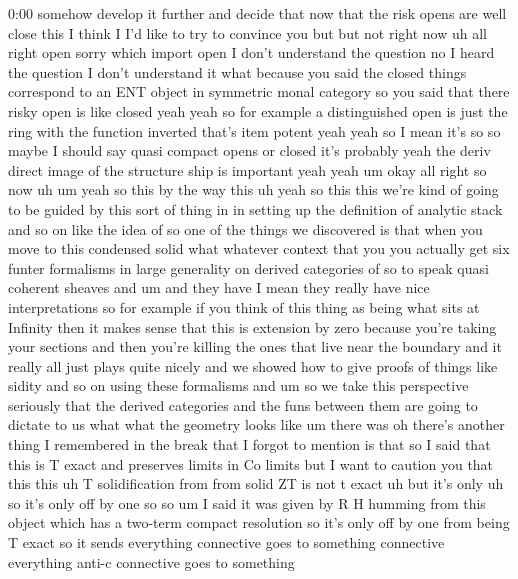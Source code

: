 \begin{unfinished}{0:00}
somehow  develop  it  further  and  decide
that  now  that  the  risk  opens
are  well  close
this  I  think  I  I'd  like  to  try  to
convince  you  but  but  not  right  now
uh  all
right
open  sorry  which  import
open  I  don't  understand  the
question  no  I  heard  the  question  I  don't
understand  it  what  because  you  said  the
closed  things  correspond  to  an  ENT
object  in  symmetric  monal  category  so
you  said  that  there  risky  open  is  like
closed  yeah  yeah  so  for  example  a
distinguished  open  is  just  the  ring  with
the  function  inverted  that's  item  potent
yeah
yeah  so  I  mean  it's  so  so  maybe  I  should
say  quasi  compact  opens  or  closed  it's
probably
yeah  the  deriv  direct  image  of  the
structure  ship  is  important  yeah  yeah  um
okay  all  right  so  now
uh  um  yeah  so  this  by  the  way  this
uh  yeah  so  this  this  we're  kind  of  going
to  be  guided  by  this  sort  of  thing  in  in
setting  up  the  definition  of  analytic
stack  and  so  on  like  the  idea  of  so  one
of  the  things  we  discovered  is  that  when
you  move  to  this  condensed  solid  what
whatever  context  that  you  you  actually
get  six  funter  formalisms  in  large
generality  on  derived  categories  of  so
to  speak  quasi  coherent  sheaves  and  um
and  they  have  I  mean  they  really  have
nice  interpretations  so  for  example  if
you  think  of  this  thing  as  being  what
sits  at  Infinity  then  it  makes  sense
that  this  is  extension  by  zero  because
you're  taking  your  sections  and  then
you're  killing  the  ones  that  live  near
the  boundary  and  it  really  all  just
plays  quite  nicely  and  we  showed  how  to
give  proofs  of  things  like  sidity  and  so
on  using  these  formalisms  and  um  so  we
take  this  perspective  seriously  that  the
derived  categories  and  the  funs  between
them  are  going  to  dictate  to  us  what
what  the  geometry  looks
like  um  there  was  oh  there's  another
thing  I  remembered  in  the  break  that  I
forgot  to  mention  is  that  so  I  said  that
this  is  T  exact  and  preserves  limits  in
Co  limits  but  I  want  to  caution  you  that
this  this  uh  T  solidification  from  from
solid  ZT  is  not  t
exact  uh  but  it's  only  uh  so  it's  only
off  by  one  so  so  um  I  said  it  was  given
by  R  H  humming  from  this  object  which
has  a  two-term  compact  resolution  so
it's  only  off  by  one  from  being  T  exact
so  it  sends  everything  connective  goes
to  something  connective  everything
anti-c  connective  goes  to  something

\end{unfinished}
